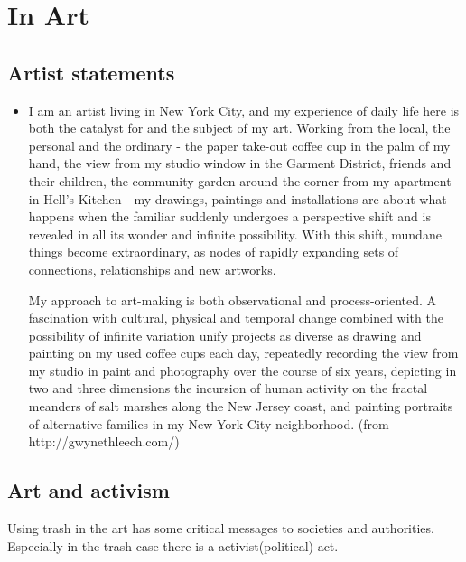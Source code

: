\section{In Art}


\subsection{Artist statements}
\begin{itemize}
\item I am an artist living in New York City, and my experience of daily life here is both the catalyst for and the subject of my art. Working from the local, the personal and the ordinary - the paper take-out coffee cup in the palm of my hand, the view from my studio window in the Garment District, friends and their children, the community garden around the corner from my apartment in Hell's Kitchen - my drawings, paintings and installations are about what happens when the familiar suddenly undergoes a perspective shift and is revealed in all its wonder and infinite possibility. With this shift, mundane things become extraordinary, as nodes of rapidly expanding sets of connections, relationships and new artworks. 

My approach to art-making is both observational and process-oriented. A fascination with cultural, physical and temporal change combined with the possibility of infinite variation unify projects as diverse as drawing and painting on my used coffee cups each day, repeatedly recording the view from my studio in paint and photography over the course of six years, depicting in two and three dimensions the incursion of human activity on the fractal meanders of salt marshes along the New Jersey coast, and painting portraits of alternative families in my New York City neighborhood. (from http://gwynethleech.com/)
\end{itemize}


\subsection{Art and activism}
Using trash in the art has some critical messages to societies and authorities. Especially in the trash case there is a activist(political) act. 

